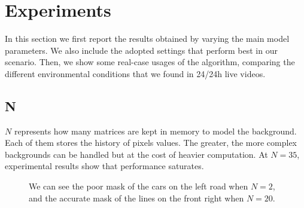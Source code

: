 \section*{Experiments}
In this section we first report the results obtained by varying the main model parameters. We also include the
adopted settings that perform best in our scenario. Then, we show some real-case usages of the algorithm,
comparing the different environmental conditions that we found in 24/24h live videos.

\subsection*{N}
$N$ represents how many matrices are kept in memory to model the background.
Each of them stores the history of pixels values.
The greater, the more complex backgrounds can be handled but at the cost of heavier
computation. At $N=35$, experimental results show that performance saturates.
\begin{figure}[!t]
\centering
{}
\newline
{}
\newline
{}
\caption{We can see the poor mask of the cars on the left road when $N=2$, and the
accurate mask of the lines on the front right when $N=20$.}
\end{figure}


